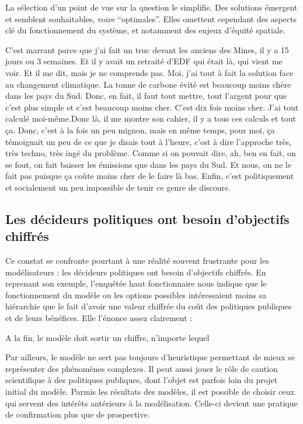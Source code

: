 La sélection d'un point de vue sur la question le simplifie. Des solutions émergent et semblent souhaitables, voire \enquote{optimales}. Elles omettent cependant des aspects clé du fonctionnement du système, et notamment des enjeux d'équité spatiale. 


\begin{authoredquote}
    C'est marrant parce que j'ai fait un truc devant les anciens des Mines, il y a 15 jours ou 3 semaines. Et il y avait un retraité d'EDF qui était là,  qui vient me voir. Et il me dit, mais je ne comprends pas. Moi, j'ai tout à fait la solution face au changement climatique. La tonne de carbone évité est beaucoup moins chère dans les pays du Sud. Donc, en fait, il faut tout mettre, tout l'argent pour que c'est plus simple et c'est beaucoup moins cher. C'est dix fois moins cher. J'ai tout calculé moi-même.Donc là, il me montre son cahier, il y a tous ces calculs et tout ça. Donc, c'est à la fois un peu mignon, mais en même temps, pour moi, ça témoignait un peu de ce que je disais tout à l'heure, c'est à dire l'approche très, très techno, très ingé du problème. Comme si on pouvait dire, ah, ben en fait, on se fout, on fait baisser les émissions que dans les pays du Sud. Et nous, on ne le fait pas puisque ça coûte moins cher de le faire là bas. Enfin, c'est politiquement et socialement un peu impossible de tenir ce genre de discours.
\end{authoredquote}


\subsection{Les décideurs politiques ont besoin d'objectifs chiffrés}

Ce constat se confronte pourtant à une réalité souvent frustrante pour les modélisateurs : les décideurs politiques ont besoin d'objectifs chiffrés. En reprenant son exemple, l'enquêtée haut fonctionnaire nous indique que le fonctionnement du modèle ou les options possibles intéressaient moins sa hiérarchie que le fait d'avoir une valeur chiffrée du coût des politiques publiques et de leurs bénéfices. Elle l'énonce assez clairement :  

\begin{authoredquote}
    A la fin, le modèle doit sortir un chiffre, n'importe lequel
\end{authoredquote}

Par ailleurs, le modèle ne sert pas toujours d'heuristique permettant de mieux se représenter des phénomènes complexes. Il peut aussi jouer le rôle de caution scientifique à des politiques publiques, dont l'objet est parfois loin du projet initial du modèle. Parmis les résultats des modèles, il est possible de choisir ceux qui servent des intérêts antérieurs à la modélisation. Celle-ci devient une pratique de confirmation plus que de prospective. 

